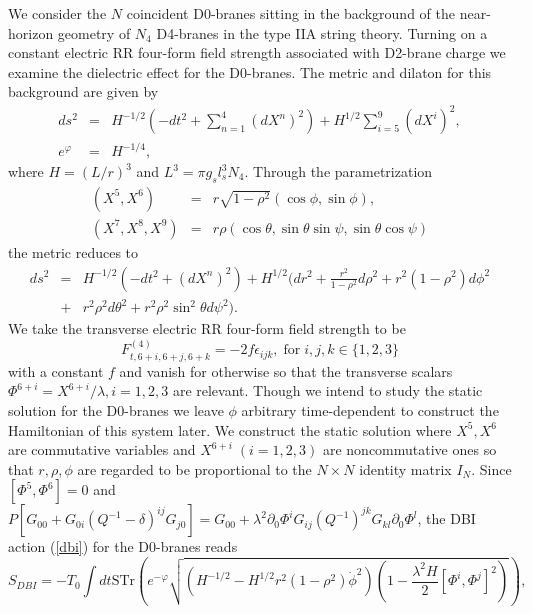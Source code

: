 \documentclass[12pt,a4paper]{article}
\newcommand{\la}{\lambda}
\begin{document}
We consider the $N$ coincident D0-branes sitting in the background
of the near-horizon geometry of $N_4$ D4-branes in the type IIA string 
theory. Turning on a constant electric RR four-form field strength 
associated with D2-brane charge we  examine the dielectric 
effect for the D0-branes. The metric and dilaton for this background
are given by
\begin{eqnarray}
ds^2 &=& H^{-1/2}(-dt^2 + \sum_{n=1}^{4}(dX^n)^2 ) + H^{1/2}
\sum_{i=5}^{9}(dX^i)^2,
\nonumber \\ e^{\varphi} &=& H^{-1/4},
\end{eqnarray}
where $H = (L/r)^3$ and $L^3 = \pi g_sl^3_sN_4$. Through the 
parametrization
\begin{eqnarray}
(X^5, X^6) &=& r\sqrt{1-\rho^2} (\cos \phi, \sin \phi), \nonumber \\
(X^7, X^8, X^9) &=& r\rho(\cos\theta, \sin\theta\sin\psi, 
\sin\theta\cos\psi)
\label{cor}\end{eqnarray}
the metric reduces to
\begin{eqnarray}
ds^2 &=& H^{-1/2}( -dt^2 + (dX^n)^2 ) + H^{1/2}( dr^2 + \frac{r^2}
{1- \rho^2}d\rho^2 + r^2(1-\rho^2)d\phi^2 \nonumber \\
&+& r^2\rho^2d\theta^2 + r^2\rho^2\sin^2\theta d\psi^2 ).
\end{eqnarray}
We take the transverse electric RR four-form field strength to be
\begin{equation}
F^{(4)}_{t,6+i,6+j,6+k} = -2f\epsilon_{ijk},\; \mathrm{for}\; 
i,j,k \in \{1,2,3\}
\label{str}\end{equation}
with a constant $f$ and vanish for otherwise so that the transverse 
scalars $\Phi^{6+i} = X^{6+i}/\la, i=1,2,3$ are relevant.
Though we intend to study the static solution for the D0-branes
we leave $\phi$ arbitrary time-dependent to construct the Hamiltonian
of this system later. We construct the 
static solution where $X^5, X^6$ are 
commutative variables and $X^{6+i}\; ( i=1,2,3 )$ are noncommutative ones
so that $r, \rho, \phi$ are regarded to be proportional to the 
$N \times N$ identity matrix $I_N$. Since $[\Phi^5,\Phi^6]=0$ and
$P[G_{00} + G_{0i}(Q^{-1} - \delta)^{ij}
G_{j0}] = G_{00} + \la^2\partial_0\Phi^iG_{ij}(Q^{-1})^{jk}G_{kl}
\partial_0\Phi^l$, the DBI action (\ref{dbi}) for the D0-branes reads
\begin{equation}
S_{DBI} = - T_0 \int dt \mathrm{STr}(e^{-\varphi}\sqrt{(H^{-1/2} -
H^{1/2}r^2(1-\rho^2)\dot{\phi}^2)(1 - \frac{\la^2H}{2}
[\Phi^i, \Phi^j]^2)} ),
\label{act}\end{equation}
\end{document}
